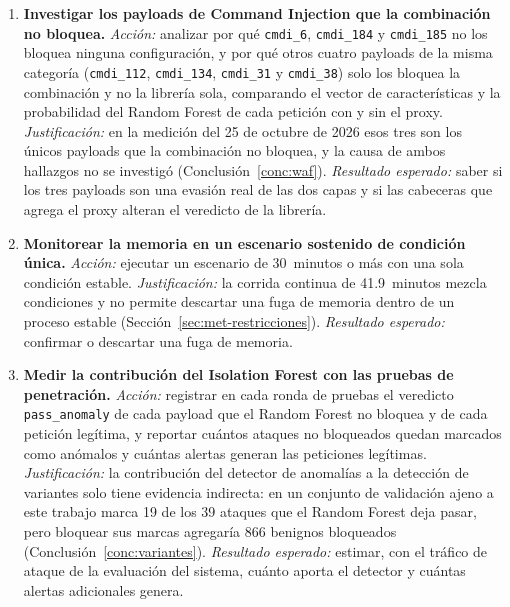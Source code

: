 \begin{enumerate}
    \item \textbf{Investigar los payloads de Command Injection que la combinación no bloquea.}
    \textit{Acción:} analizar por qué \texttt{cmdi\_6}, \texttt{cmdi\_184} y \texttt{cmdi\_185} no
    los bloquea ninguna configuración, y por qué otros cuatro payloads de la misma categoría
    (\texttt{cmdi\_112}, \texttt{cmdi\_134}, \texttt{cmdi\_31} y \texttt{cmdi\_38}) solo los bloquea
    la combinación y no la librería sola, comparando el vector de características y la
    probabilidad del Random Forest de cada petición con y sin el proxy. \textit{Justificación:} en
    la medición del 25 de octubre de 2026 esos tres son los únicos payloads que la combinación
    no bloquea, y la causa de ambos hallazgos no se investigó
    (Conclusión~\ref{conc:waf}). \textit{Resultado esperado:} saber si los tres payloads son una
    evasión real de las dos capas y si las cabeceras que agrega el proxy alteran el veredicto de la
    librería.

    \item \textbf{Monitorear la memoria en un escenario sostenido de condición única.}
    \textit{Acción:} ejecutar un escenario de 30~minutos o más con una sola condición estable.
    \textit{Justificación:} la corrida continua de 41.9~minutos mezcla condiciones y no permite
    descartar una fuga de memoria dentro de un proceso estable (Sección~\ref{sec:met-restricciones}).
    \textit{Resultado esperado:} confirmar o descartar una fuga de memoria.

    \item \textbf{Medir la contribución del Isolation Forest con las pruebas de penetración.}
    \textit{Acción:} registrar en cada ronda de pruebas el veredicto \texttt{pass\_anomaly} de cada
    payload que el Random Forest no bloquea y de cada petición legítima, y reportar cuántos
    ataques no bloqueados quedan marcados como anómalos y cuántas alertas generan las peticiones
    legítimas. \textit{Justificación:} la contribución del detector de anomalías a la detección de
    variantes solo tiene evidencia indirecta: en un conjunto de validación ajeno a este trabajo marca
    19 de los 39 ataques que el Random Forest deja pasar, pero bloquear sus marcas agregaría 866
    benignos bloqueados \cite{valenzuela2026ia} (Conclusión~\ref{conc:variantes}).
    \textit{Resultado esperado:} estimar, con el tráfico de ataque de la evaluación del sistema,
    cuánto aporta el detector y cuántas alertas adicionales genera.
\end{enumerate}

